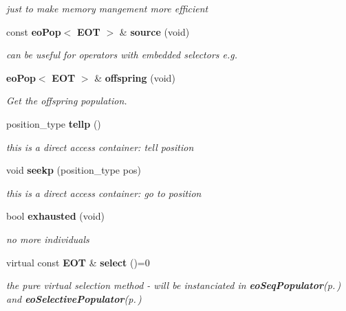 \begin{CompactItemize}
\begin{CompactList}\small\item\em just to make memory mangement more efficient \item\end{CompactList}\item 
const {\bf eo\-Pop}$<$ {\bf EOT} $>$ \& {\bf source} (void)
\begin{CompactList}\small\item\em can be useful for operators with embedded selectors e.g. \item\end{CompactList}\item 
{\bf eo\-Pop}$<$ {\bf EOT} $>$ \& {\bf offspring} (void)
\begin{CompactList}\small\item\em Get the offspring population. \item\end{CompactList}\item 
position\_\-type {\bf tellp} ()\label{classeo_populator_a8}

\begin{CompactList}\small\item\em this is a direct access container: tell position \item\end{CompactList}\item 
void {\bf seekp} (position\_\-type pos)\label{classeo_populator_a9}

\begin{CompactList}\small\item\em this is a direct access container: go to position \item\end{CompactList}\item 
bool {\bf exhausted} (void)\label{classeo_populator_a10}

\begin{CompactList}\small\item\em no more individuals \item\end{CompactList}\item 
virtual const {\bf EOT} \& {\bf select} ()=0\label{classeo_populator_a11}

\begin{CompactList}\small\item\em the pure virtual selection method - will be instanciated in {\bf eo\-Seq\-Populator}{\rm (p.\,\pageref{classeo_seq_populator})} and {\bf eo\-Selective\-Populator}{\rm (p.\,\pageref{classeo_selective_populator})} \item\end{CompactList}\end{CompactItemize}
